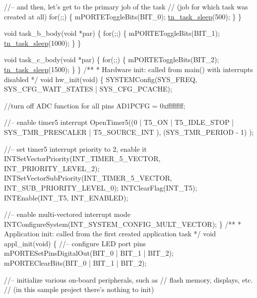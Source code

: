 \begin{DoxyCodeInclude}
   \textcolor{comment}{//-- and then, let's get to the primary job of the task}
   \textcolor{comment}{//   (job for which task was created at all)}
   \textcolor{keywordflow}{for}(;;)
   \{
      mPORTEToggleBits(BIT\_0);
      \hyperlink{tn__tasks_8h_ae768a72ca0efde5767796cc1770bd45e}{tn\_task\_sleep}(500);
   \}
\}

\textcolor{keywordtype}{void} task\_b\_body(\textcolor{keywordtype}{void} *par)
\{
   \textcolor{keywordflow}{for}(;;)
   \{
      mPORTEToggleBits(BIT\_1);
      \hyperlink{tn__tasks_8h_ae768a72ca0efde5767796cc1770bd45e}{tn\_task\_sleep}(1000);
   \}
\}

\textcolor{keywordtype}{void} task\_c\_body(\textcolor{keywordtype}{void} *par)
\{
   \textcolor{keywordflow}{for}(;;)
   \{
      mPORTEToggleBits(BIT\_2);
      \hyperlink{tn__tasks_8h_ae768a72ca0efde5767796cc1770bd45e}{tn\_task\_sleep}(1500);
   \}
\}
\textcolor{comment}{}
\textcolor{comment}{/**}
\textcolor{comment}{ * Hardware init: called from main() with interrupts disabled}
\textcolor{comment}{ */}
\textcolor{keywordtype}{void} hw\_init(\textcolor{keywordtype}{void})
\{
   SYSTEMConfig(SYS\_FREQ, SYS\_CFG\_WAIT\_STATES | SYS\_CFG\_PCACHE);

   \textcolor{comment}{//turn off ADC function for all pins}
   AD1PCFG = 0xffffffff;

   \textcolor{comment}{//-- enable timer5 interrupt}
   OpenTimer5((0
            | T5\_ON
            | T5\_IDLE\_STOP
            | SYS\_TMR\_PRESCALER
            | T5\_SOURCE\_INT
            ),
         (SYS\_TMR\_PERIOD - 1)
         );

   \textcolor{comment}{//-- set timer5 interrupt priority to 2, enable it}
   INTSetVectorPriority(INT\_TIMER\_5\_VECTOR, INT\_PRIORITY\_LEVEL\_2);
   INTSetVectorSubPriority(INT\_TIMER\_5\_VECTOR, INT\_SUB\_PRIORITY\_LEVEL\_0);
   INTClearFlag(INT\_T5);
   INTEnable(INT\_T5, INT\_ENABLED);

   \textcolor{comment}{//-- enable multi-vectored interrupt mode}
   INTConfigureSystem(INT\_SYSTEM\_CONFIG\_MULT\_VECTOR);
\}
\textcolor{comment}{}
\textcolor{comment}{/**}
\textcolor{comment}{ * Application init: called from the first created application task}
\textcolor{comment}{ */}
\textcolor{keywordtype}{void} appl\_init(\textcolor{keywordtype}{void})
\{
   \textcolor{comment}{//-- configure LED port pins}
   mPORTESetPinsDigitalOut(BIT\_0 | BIT\_1 | BIT\_2);
   mPORTEClearBits(BIT\_0 | BIT\_1 | BIT\_2);

   \textcolor{comment}{//-- initialize various on-board peripherals, such as}
   \textcolor{comment}{//   flash memory, displays, etc.}
   \textcolor{comment}{//   (in this sample project there's nothing to init)}


\end{DoxyCodeInclude}
